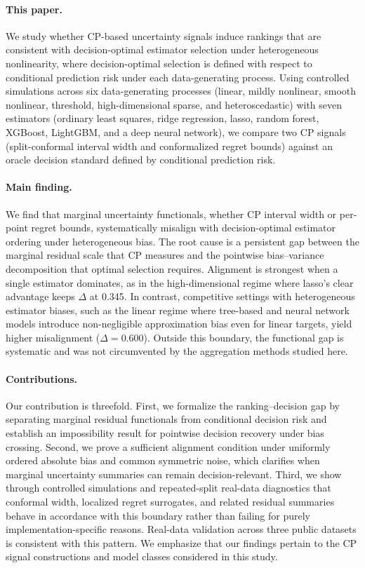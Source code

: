 \documentclass[a4paper,11pt]{article}
\begin{document}
\paragraph{This paper.}
We study whether CP-based uncertainty signals induce rankings that are consistent with decision-optimal estimator selection under heterogeneous nonlinearity, where decision-optimal selection is defined with respect to conditional prediction risk under each data-generating process. Using controlled simulations across six data-generating processes (linear, mildly nonlinear, smooth nonlinear, threshold, high-dimensional sparse, and heteroscedastic) with seven estimators (ordinary least squares, ridge regression, lasso, random forest, XGBoost, LightGBM, and a deep neural network), we compare two CP signals (split-conformal interval width and conformalized regret bounds) against an oracle decision standard defined by conditional prediction risk.

\paragraph{Main finding.}
We find that marginal uncertainty functionals, whether CP interval width or per-point regret bounds, systematically misalign with decision-optimal estimator ordering under heterogeneous bias. The root cause is a persistent gap between the marginal residual scale that CP measures and the pointwise bias--variance decomposition that optimal selection requires. Alignment is strongest when a single estimator dominates, as in the high-dimensional regime where lasso's clear advantage keeps $\Delta$ at 0.345. In contrast, competitive settings with heterogeneous estimator biases, such as the linear regime where tree-based and neural network models introduce non-negligible approximation bias even for linear targets, yield higher misalignment ($\Delta = 0.600$). Outside this boundary, the functional gap is systematic and was not circumvented by the aggregation methods studied here.

\paragraph{Contributions.}
Our contribution is threefold. First, we formalize the ranking--decision gap by separating marginal residual functionals from conditional decision risk and establish an impossibility result for pointwise decision recovery under bias crossing. Second, we prove a sufficient alignment condition under uniformly ordered absolute bias and common symmetric noise, which clarifies when marginal uncertainty summaries can remain decision-relevant. Third, we show through controlled simulations and repeated-split real-data diagnostics that conformal width, localized regret surrogates, and related residual summaries behave in accordance with this boundary rather than failing for purely implementation-specific reasons. Real-data validation across three public datasets is consistent with this pattern. We emphasize that our findings pertain to the CP signal constructions and model classes considered in this study.
\end{document}
